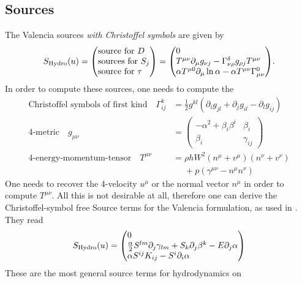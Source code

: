 \documentclass[a4paper]{article}
\newcommand{\desc}[1]{\text{#1}\quad}
\newcommand{\hydro}{\text{Hydro}}
\newenvironment{pvector}{\begin{pmatrix*}[l]}{\end{pmatrix*}}
\begin{document}
\subsection{Sources}
The Valencia sources \emph{with Christoffel symbols} are given by
\begin{equation}
S_\hydro(u) =
\begin{pvector}
\text{source for } D \\
\text{sources for } S_j \\
\text{source for } \tau
\end{pvector}
=
\begin{pvector}
0
\\
T^{\mu\nu} \partial_\mu g_{\nu j} - \Gamma^\delta_{\nu\rho} g_{\rho j} T^{\mu\nu}
\\
\alpha T^{\mu 0} \partial_\mu \ln \alpha - \alpha T^{\mu\nu} \Gamma^0_{\mu\nu}
\end{pvector}.
\end{equation}
In order to compute these sources, one needs to compute the
\begin{align}
\desc{Christoffel symbols of first kind} \Gamma^k_{ij}
&= \frac{1}{2} g^{kl} \left(\partial_i g_{jl} + \partial_j g_{il} - \partial_l g_{ij}\right)
\\
\desc{4-metric}
g_{\mu\nu} &= 
\begin{pmatrix}
-\alpha^2 + \beta_i \beta^i  & \beta_i \\
\beta_i                      & \gamma_{ij}
\end{pmatrix}
\\
\desc{4-energy-momentum-tensor}
T^{\mu\nu} &=
\rho h W^2 (n^\mu + v^\mu) (n^\nu + v^\nu)
\\ &\phantom{=} + p(\gamma^{\mu\nu} - n^\mu n^\nu)
\nonumber
\end{align}
One needs to recover the 4-velocity $u^\mu$ or the normal vector
$n^\mu$ in order to compute $T^{\mu\nu}$. All this is not desirable
at all, therefore one can derive the Christoffel-symbol free Source
terms for the Valencia formulation, as used in \cite{THC}. They read
\begin{equation}
S_\hydro(u) =
\begin{pvector}
0
\\
\frac \alpha2 S^{lm} \partial_j \gamma_{lm} + S_k \partial_j \beta^k - E \partial_j \alpha
\\
\alpha S^{ij} K_{ij} - S^i \partial_i \alpha
\end{pvector}
\end{equation}
These are the most general source terms for hydrodynamics on
\end{document}
